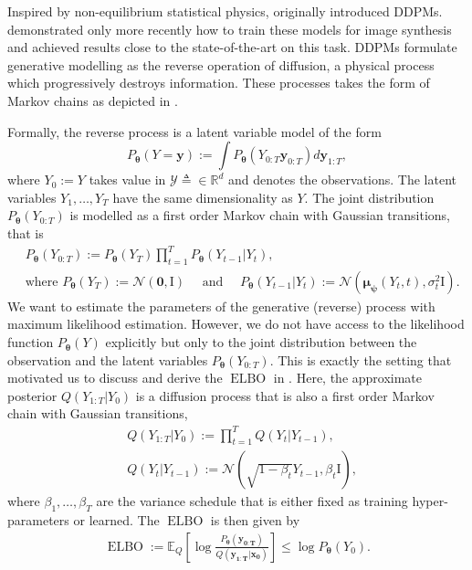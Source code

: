 Inspired by non-equilibrium statistical physics, \citet{sohl-dickstein_deep_2015} originally introduced DDPMs. \citet{ho_denoising_2020}  demonstrated only more recently how to train these models for image synthesis and achieved results close to the state-of-the-art on this task. DDPMs formulate generative modelling as the reverse operation of diffusion, a physical process which progressively destroys information. These processes takes the form of Markov chains as depicted in .

Formally, the reverse process is a latent variable model of the form
$$P_{\bm{\theta}}(Y=\mathbf{y}) := \int P_{\bm{\theta}}(Y_{0:T} \mathbf{y}_{0:T}) d\mathbf{y}_{1:T},$$
where $Y_0:=Y$ takes value in $\mathcal{Y} \triangleq \in \mathbb{R}^d$ and denotes the observations. The latent variables $Y_1, \dots, Y_T$ have the same dimensionality as $Y$. The joint distribution $P_{\bm{\theta}}(Y_{0:T})$ is modelled as a first order Markov chain with Gaussian transitions, that is
\begin{align}
    &P_{\bm{\theta}}(Y_{0:T}) := P_{\bm{\theta}}(Y_{T}) \prod^T_{t=1} P_{\bm{\theta}}(Y_{t-1}|Y_{t}),\\
    & \text{where } P_{\bm{\theta}}(Y_{T}) := \mathcal{N}(\mathbf{0}, \text{I}) \quad \text{ and } \quad P_{\bm{\theta}}(Y_{t-1}|Y_{t}) := \mathcal{N}(\mathbf{\mu_\psi}(Y_t, t), \sigma_t^2 \text{I}).
\end{align}
We want to estimate the parameters of the generative (reverse) process with maximum likelihood estimation. However, we do not have access to the likelihood function $P_{\bm{\theta}}(Y)$ explicitly but only to the joint distribution between the observation and the latent variables $P_{\bm{\theta}}(Y_{0:T})$. This is exactly the setting that motivated us to discuss and derive the $\operatorname{ELBO}$ in .
Here, the approximate posterior $Q(Y_{1:T}|Y_0)$ is a diffusion process that is also a first order Markov chain with Gaussian transitions,
\begin{align}
    &Q(Y_{1:T}|Y_0) := \prod^T_{t=1} Q(Y_{t}|Y_{t-1}),\\
    &Q(Y_{t}|Y_{t-1}) := \mathcal{N}(\sqrt{1-\beta_t} Y_{t-1}, \beta_t \text{I}),
\end{align}
where $\beta_1, \hdots, \beta_T$ are the variance schedule that is either fixed as training hyper-parameters or learned.
The $\operatorname{ELBO}$ is then given by
\begin{align}
    \operatorname{ELBO} := \mathbb{E}_Q\left[ \log \frac{P_{\bm{\theta}}(\mathbf{y_{0:T}})}{Q(\mathbf{y_{1:T}}|\mathbf{x_0})} \right] \leq \log P_{\bm{\theta}}(Y_0). \label{eq:ELBO_DDPM}
\end{align}

